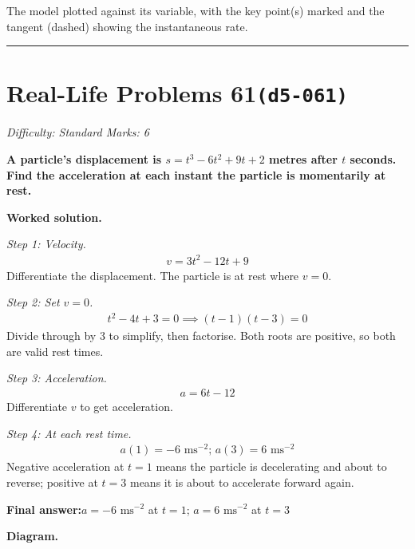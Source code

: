 \documentclass[11pt]{article}
\newcommand{\question}[1]{\par\medskip\noindent\textbf{#1}\par}
\begin{document}
\small The model plotted against its variable, with the key point(s) marked and the tangent (dashed) showing the instantaneous rate.\normalsize

\medskip\hrule

\section*{Real-Life Problems 61\quad\small\texttt{(d5-061)}}
\textit{Difficulty: Standard \quad\textbar\quad Marks: 6}

\question{A particle's displacement is \( s = t^3 - 6t^2 + 9t + 2 \) metres after \( t \) seconds. Find the acceleration at each instant the particle is momentarily at rest.}

\textbf{Worked solution.}

\textit{Step 1: Velocity.}
\[\begin{gathered}
v = 3t^2 - 12t + 9
\end{gathered}\]
Differentiate the displacement. The particle is at rest where \( v = 0 \).

\textit{Step 2: Set \( v = 0 \).}
\[\begin{gathered}
t^2 - 4t + 3 = 0 \implies (t-1)(t-3) = 0
\end{gathered}\]
Divide through by 3 to simplify, then factorise. Both roots are positive, so both are valid rest times.

\textit{Step 3: Acceleration.}
\[\begin{gathered}
a = 6t - 12
\end{gathered}\]
Differentiate \( v \) to get acceleration.

\textit{Step 4: At each rest time.}
\[\begin{gathered}
a(1) = -6 \text{ ms}^{-2}; \, a(3) = 6 \text{ ms}^{-2}
\end{gathered}\]
Negative acceleration at \( t = 1 \) means the particle is decelerating and about to reverse; positive at \( t = 3 \) means it is about to accelerate forward again.

\begin{answerbox}
\textbf{Final answer:}\quad \(\displaystyle  a = -6 \text{ ms}^{-2} \) at \(\displaystyle  t = 1 \); \(\displaystyle  a = 6 \text{ ms}^{-2} \) at \(\displaystyle  t = 3 \)
\end{answerbox}
\textbf{Diagram.}
\end{document}
